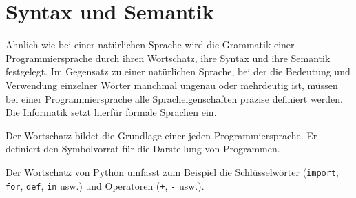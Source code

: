 \toggletrue{image}
\toggletrue{imagehover}

\chapter{Syntax und Semantik}
\label{chapter-syntax-und-semantik}

Ähnlich wie bei einer natürlichen Sprache wird die Grammatik einer Programmiersprache durch ihren Wortschatz, ihre Syntax und ihre Semantik festgelegt. Im Gegensatz zu einer natürlichen Sprache, bei der die Bedeutung und Verwendung einzelner Wörter manchmal ungenau oder mehrdeutig ist, müssen bei einer Programmiersprache alle Spracheigenschaften präzise definiert werden. Die Informatik setzt hierfür formale Sprachen ein.

%


\begin{definition}[Wortschatz]
Der Wortschatz bildet die Grundlage einer jeden Programmiersprache. Er definiert den Symbolvorrat für die Darstellung von Programmen.
\end{definition}

\begin{example}[Python]
Der Wortschatz von Python umfasst zum Beispiel die Schlüsselwörter (\lstinline{import}, \lstinline{for}, \lstinline{def}, \lstinline{in} usw.) und Operatoren (\lstinline{+}, \lstinline{-} usw.).
\end{example}
 

